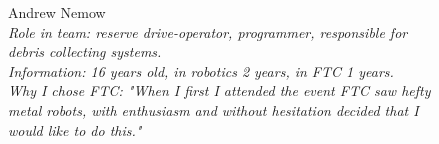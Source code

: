 \begin{figure}[H]
	\begin{minipage}{0.47\linewidth}
		Andrew Nemow\\
		\emph{Role in team: reserve drive-operator, programmer, responsible for debris collecting systems.\\}
		\emph{Information: 16 years old, in robotics 2 years, in FTC 1 years.\\} 
		\emph{Why I chose FTC: "When I first I attended the event FTC saw hefty metal robots, with enthusiasm and without hesitation decided that I would like to do this."}				
	\end{minipage}
	\hfill
	\begin{minipage}{0.47\linewidth}
		\\
	\end{minipage}
	\vfill
\end{figure}


